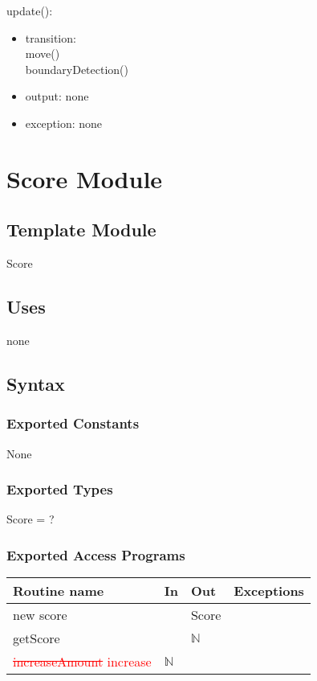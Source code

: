 \documentclass[12pt]{article}
\begin{document}
\noindent update():
\begin{itemize}
\item transition: \\move()\\boundaryDetection()
\item output: none
\item exception: none
\end{itemize}

\newpage

\section{Score Module}

\subsection*{Template Module}
Score

\subsection*{Uses}
none

\subsection*{Syntax}
\subsubsection*{Exported Constants}
None
\subsubsection*{Exported Types}
Score = ?
\subsubsection*{Exported Access Programs}
\begin{tabular}{| l | l | l | p{5cm} |}
\hline
\textbf{Routine name} & \textbf{In} & \textbf{Out} & \textbf{Exceptions}\\
\hline
new score &  & Score &\\
\hline
getScore &    & $\mathbb{N}$ & \\
\hline
\textcolor{red}{\st{
increaseAmount} increase} & $\mathbb{N}$ & &\\
\hline
\end{tabular}
\end{document}
